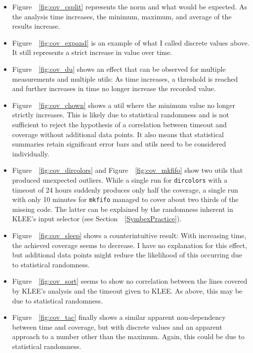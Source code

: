 \documentclass{article}
\let\savedRef=\ref
\renewcommand{\ref}{\unskip~\savedRef}
\begin{document}
\begin{itemize}
    \item Figure~\ref{fig:cov_csplit} represents the norm and what would be expected. As the analysis time increases, the minimum, maximum, and average of the results increase.
    \item Figure~\ref{fig:cov_expand} is an example of what I called discrete values above. It still represents a strict increase in value over time.
    \item Figure~\ref{fig:cov_du} shows an effect that can be observed for multiple measurements and multiple utils: As time increases, a threshold is reached and further increases in time no longer increase the recorded value.
    \item Figure~\ref{fig:cov_chown} shows a util where the minimum value no longer strictly increases. This is likely due to statistical randomness and is not sufficient to reject the hypothesis of a correlation between timeout and coverage without additional data points. It also means that statistical summaries retain significant error bars and utils need to be considered individually.
    \item Figure~\ref{fig:cov_dircolors} and Figure~\ref{fig:cov_mkfifo} show two utils that produced unexpected outliers. While a single run for \lstinline{dircolors} with a timeout of 24 hours suddenly produces only half the coverage, a single run with only 10 minutes for \lstinline{mkfifo} managed to cover about two thirds of the missing code. The latter can be explained by the randomness inherent in KLEE's input selector (see Section~\ref{SymbexPractice}).
    \item Figure~\ref{fig:cov_sleep} shows a counterintuitive result: With increasing time, the achieved coverage seems to decrease. I have no explanation for this effect, but additional data points might reduce the likelihood of this occurring due to statistical randomness.
    \item Figure~\ref{fig:cov_sort} seems to show no correlation between the lines covered by KLEE's analysis and the timeout given to KLEE. As above, this may be due to statistical randomness.
    \item Figure~\ref{fig:cov_tac} finally shows a similar apparent non-dependency between time and coverage, but with discrete values and an apparent approach to a number other than the maximum. Again, this could be due to statistical randomness.
\end{itemize}
\end{document}
